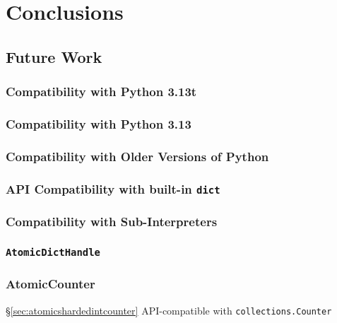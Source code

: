 \chapter{Conclusions}\label{ch:conclusions}

\section{Future Work}

\subsection{Compatibility with Python 3.13t}
\subsection{Compatibility with Python 3.13}
\subsection{Compatibility with Older Versions of Python}
\subsection{API Compatibility with built-in \texttt{dict}}
\subsection{Compatibility with Sub-Interpreters}
\subsection{\texttt{AtomicDictHandle}}
\subsection{AtomicCounter}
\S\ref{sec:atomicshardedintcounter}
API-compatible with \texttt{collections.Counter}
